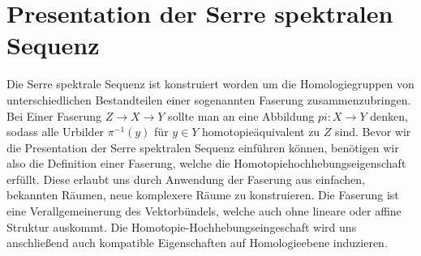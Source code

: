 \documentclass[12pt, hidelinks]{article}
\numberwithin{conj}{section}
\begin{document}
\section{Presentation der Serre spektralen Sequenz}
Die Serre spektrale Sequenz ist konstruiert worden um die Homologiegruppen von unterschiedlichen Bestandteilen einer sogenannten Faserung zusammenzubringen. Bei Einer Faserung $Z \to X \to Y$ sollte man an eine Abbildung $pi: X \to Y$ denken, sodass alle Urbilder $\pi^{-1}(y)$ für $y \in Y$ homotopieäquivalent zu $Z$ sind. Bevor wir die Presentation der Serre spektralen Sequenz einführen können, benötigen wir also die Definition einer Faserung, welche die Homotopiehochhebungseigenschaft erfüllt. Diese erlaubt uns durch Anwendung der Faserung aus einfachen, bekannten Räumen, neue komplexere Räume zu konstruieren. Die Faserung ist eine Verallgemeinerung des Vektorbündels, welche auch ohne lineare oder affine Struktur auskommt. Die Homotopie-Hochhebungseingeschaft wird uns anschließend auch kompatible Eigenschaften auf Homologieebene induzieren.
\end{document}
